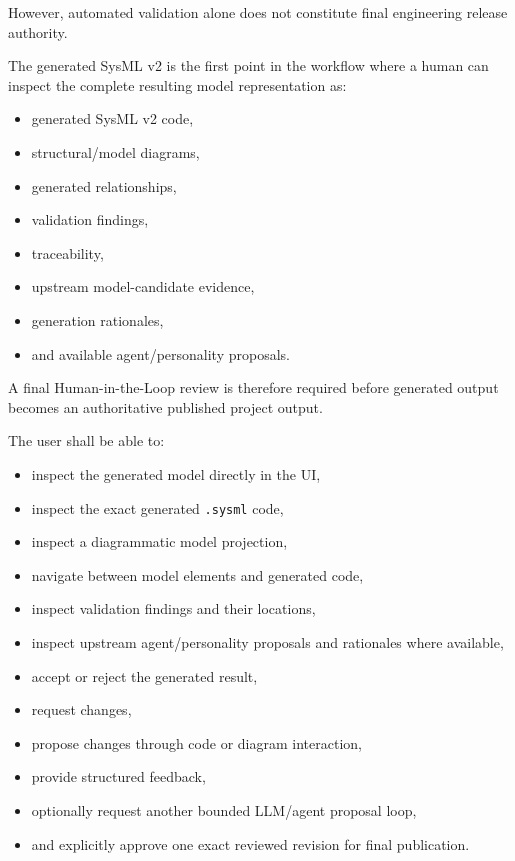 However, automated validation alone does not constitute final engineering release authority.

The generated SysML v2 is the first point in the workflow where a human can inspect the complete resulting model representation as:

\begin{itemize}
\tightlist
\item
  generated SysML v2 code,
\item
  structural/model diagrams,
\item
  generated relationships,
\item
  validation findings,
\item
  traceability,
\item
  upstream model-candidate evidence,
\item
  generation rationales,
\item
  and available agent/personality proposals.
\end{itemize}

A final Human-in-the-Loop review is therefore required before generated output becomes an authoritative published project output.

The user shall be able to:

\begin{itemize}
\tightlist
\item
  inspect the generated model directly in the UI,
\item
  inspect the exact generated \texttt{.sysml} code,
\item
  inspect a diagrammatic model projection,
\item
  navigate between model elements and generated code,
\item
  inspect validation findings and their locations,
\item
  inspect upstream agent/personality proposals and rationales where available,
\item
  accept or reject the generated result,
\item
  request changes,
\item
  propose changes through code or diagram interaction,
\item
  provide structured feedback,
\item
  optionally request another bounded LLM/agent proposal loop,
\item
  and explicitly approve one exact reviewed revision for final publication.
\end{itemize}

